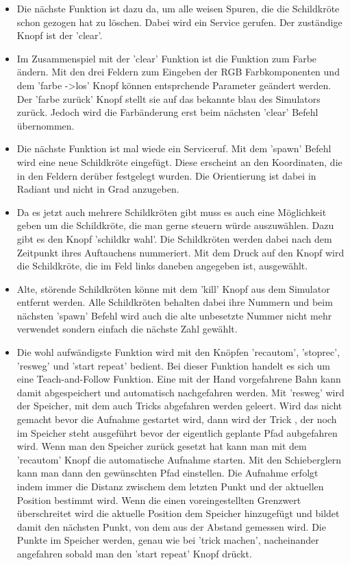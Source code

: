 \documentclass[11pt]{scrartcl}
\begin{document}
\begin{onehalfspace}
\begin{itemize}
\begin{itemize}
\end{itemize}
\item Die nächste Funktion ist dazu da, um alle weisen Spuren, die die Schildkröte schon gezogen hat zu löschen. Dabei wird ein Service gerufen. Der zuständige Knopf ist der 'clear'.
\item Im Zusammenspiel mit der 'clear' Funktion ist die Funktion zum Farbe ändern. Mit den drei Feldern zum Eingeben der RGB Farbkomponenten und dem 'farbe ->los' Knopf können entsprchende Parameter geändert werden. Der 'farbe zurück' Knopf stellt sie auf das bekannte blau des Simulators zurück. Jedoch wird die Farbänderung erst beim nächsten 'clear' Befehl übernommen.
\item Die nächste Funktion ist mal wiede ein Serviceruf. Mit dem 'spawn' Befehl wird eine neue Schildkröte eingefügt. Diese erscheint an den Koordinaten, die in den Feldern derüber festgelegt wurden. Die Orientierung ist dabei in Radiant und nicht in Grad anzugeben. 
\item Da es jetzt auch mehrere Schildkröten gibt muss es auch eine Möglichkeit geben um die Schildkröte, die man gerne steuern würde auszuwählen. Dazu gibt es den Knopf 'schildkr wahl'. Die Schildkröten werden dabei nach dem Zeitpunkt ihres Auftauchens nummeriert. Mit dem Druck auf den Knopf wird die Schildkröte, die im Feld links daneben angegeben ist, ausgewählt.
\item Alte, störende Schildkröten könne mit dem 'kill' Knopf aus dem Simulator entfernt werden. Alle Schildkröten behalten dabei ihre Nummern und beim nächsten 'spawn' Befehl wird auch die alte unbesetzte Nummer nicht mehr verwendet sondern einfach die nächste Zahl gewählt.
\item Die wohl aufwändigste Funktion wird mit den Knöpfen 'recautom', 'stoprec', 'resweg' und 'start repeat' bedient. Bei dieser Funktion handelt es sich um eine Teach-and-Follow Funktion. Eine mit der Hand vorgefahrene Bahn kann damit abgespeichert und automatisch nachgefahren werden. Mit 'resweg' wird der Speicher, mit dem auch Tricks abgefahren werden geleert. Wird das nicht gemacht bevor die Aufnahme gestartet wird, dann wird der Trick , der noch im Speicher steht ausgeführt bevor der eigentlich geplante Pfad aubgefahren wird. Wenn man den Speicher zurück gesetzt hat kann man mit dem 'recautom' Knopf die automatische Aufnahme starten. Mit den Schieberglern kann man dann den gewünschten Pfad einstellen. Die Aufnahme erfolgt indem immer die Distanz zwischem dem letzten Punkt und der aktuellen Position bestimmt wird. Wenn die einen voreingestellten Grenzwert überschreitet wird die aktuelle Position dem Speicher hinzugefügt und bildet damit den nächsten Punkt, von dem aus der Abstand gemessen wird. Die Punkte im Speicher werden, genau wie bei 'trick machen', nacheinander angefahren sobald man den 'start repeat' Knopf drückt.

\end{itemize}
\end{onehalfspace}
\end{document}
